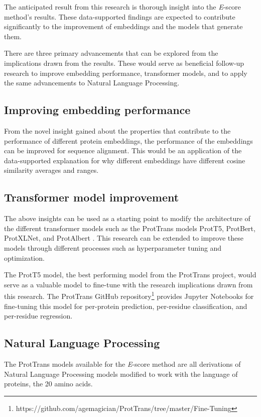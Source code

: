 \documentclass[
	letterpaper, %
	10pt, %
]{LTJournalArticle}
\begin{document}
The anticipated result from this research is thorough insight into the \textit{E}-score method's results. These data-supported findings are expected to contribute significantly to the improvement of embeddings and the models that generate them.

There are three primary advancements that can be explored from the implications drawn from the results. These would serve as beneficial follow-up research to improve embedding performance, transformer models, and to apply the same advancements to Natural Language Processing.

\subsection{Improving embedding performance}

From the novel insight gained about the properties that contribute to the performance of different protein embeddings, the performance of the embeddings can be improved for sequence alignment. This would be an application of the data-supported explanation for why different embeddings have different cosine similarity averages and ranges.

\subsection{Transformer model improvement}

The above insights can be used as a starting point to modify the architecture of the different transformer \autocite{Vaswani:2017} models such as the ProtTrans models ProtT5, ProtBert, ProtXLNet, and ProtAlbert \autocite{Elnaggar:2021}. This research can be extended to improve these models through different processes such as hyperparameter tuning and optimization.

The ProtT5 model, the best performing model from the ProtTrans project, would serve as a valuable model to fine-tune with the research implications drawn from this research. The ProtTrans GitHub repository\footnote{https://github.com/agemagician/ProtTrans/tree/master/Fine-Tuning} provides Jupyter Notebooks for fine-tuning this model for per-protein prediction, per-residue classification, and per-residue regression.

\subsection{Natural Language Processing}
The ProtTrans models available for the \textit{E}-score method are all derivations of Natural Language Processing models modified to work with the language of proteins, the 20 amino acids.
\end{document}
